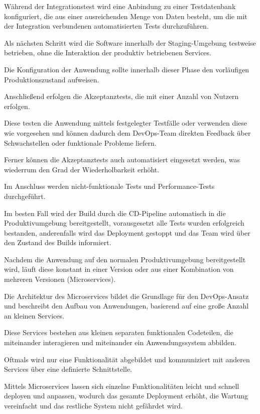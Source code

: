 Während der Integrationstest wird eine Anbindung zu einer Testdatenbank konfiguriert, die aus einer ausreichenden Menge von Daten besteht, um die mit der Integration verbundenen automatisierten Tests durchzuführen. \cite[S. 100 - 101]{bass_devops_2015}

Als nächsten Schritt wird die Software innerhalb der Staging-Umgebung testweise betrieben, ohne die Interaktion der produktiv betriebenen Services. 

Die Konfiguration der Anwendung sollte innerhalb dieser Phase den vorläufigen Produktionszustand aufweisen. \cite[S. 100 - 101]{bass_devops_2015} 

Anschließend erfolgen die Akzeptanztests, die mit einer Anzahl von Nutzern erfolgen. 

Diese testen die Anwendung mittels festgelegter Testfälle oder verwenden diese wie vorgesehen und können dadurch dem DevOps-Team direkten Feedback über Schwachstellen oder funktionale Probleme liefern. \cite[S. 16 - 18]{sharma_devops_2017}

Ferner können die Akzeptanztests auch automatisiert eingesetzt werden, was wiederrum den Grad der Wiederholbarkeit erhöht. 

Im Anschluss werden nicht-funktionale Tests und Performance-Tests durchgeführt.

Im besten Fall wird der Build durch die CD-Pipeline automatisch in die Produktivumgebung bereitgestellt, vorausgesetzt alle Tests wurden erfolgreich bestanden, anderenfalls wird das Deployment gestoppt und das Team wird über den Zustand des Builds informiert. \cite[S. 64]{forsgren_mindset_2019} 

Nachdem die Anwendung auf den normalen Produktivumgebung bereitgestellt wird, läuft diese konstant in einer Version oder aus einer Kombination von mehreren Versionen (Microservices). \cite[S. 86]{kim_devops-handbuch_2017}  

Die Architektur des Microservices bildet die Grundlage für den DevOps-Ansatz und beschreibt den Aufbau von Anwendungen, basierend auf eine große Anzahl an kleinen Services. \cite{sollner_devops_2017}

Diese Services bestehen aus kleinen separaten funktionalen Codeteilen, die miteinander interagieren und miteinander ein Anwendungssystem abbilden.  

Oftmals wird nur eine Funktionalität abgebildet und kommuniziert mit anderen Services über eine definierte Schnittstelle. 

Mittels Microservices lassen sich einzelne Funktionalitäten leicht und schnell deployen und anpassen, wodurch das gesamte Deployment erhöht, die Wartung vereinfacht und das restliche System nicht gefährdet wird. \cite[S. 85 - 86]{kim_devops-handbuch_2017}  

